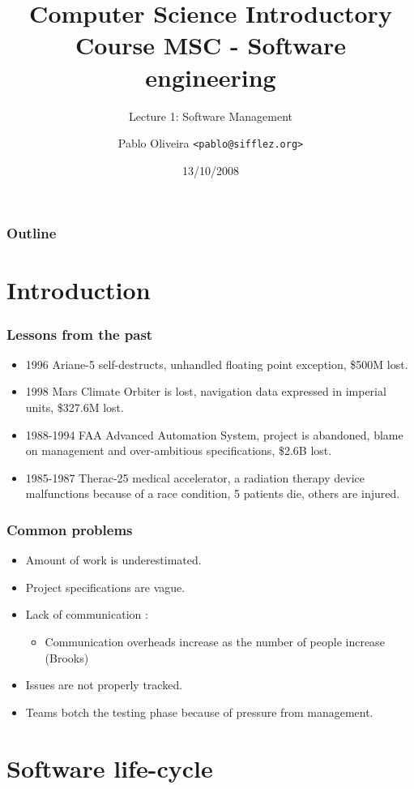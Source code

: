 \documentclass[10pt]{beamer}
\title{Computer Science Introductory Course MSC - Software engineering}
\subtitle{Lecture 1: Software Management}
\author[Pablo Oliveira]{Pablo Oliveira \texttt{<pablo@sifflez.org>}}
\institute{ENST}
\date{13/10/2008}
\begin{document}
\begin{frame}
  \titlepage
\end{frame}

\begin{frame}
  \frametitle{Outline}
  \tableofcontents
\end{frame}

\section{Introduction}
\begin{frame}[fragile]
  \frametitle{Lessons from the past}
  \begin{itemize}
  \item 1996 Ariane-5 self-destructs, unhandled floating point exception,
    \$500M lost.
  \item 1998 Mars Climate Orbiter is lost, navigation data expressed in imperial
    units, \$327.6M lost.
  \item 1988-1994 FAA Advanced Automation System, project is abandoned, blame
    on management and over-ambitious specifications, \$2.6B lost.
  \item 1985-1987 Therac-25 medical accelerator, a radiation therapy device
    malfunctions because of a race condition, 5 patients die, others are injured.
  \end{itemize}
\end{frame}

\begin{frame}[fragile]
  \frametitle{Common problems}
  \begin{itemize}
  \item Amount of work is underestimated.
  \item Project specifications are vague.
  \item Lack of communication :
    \begin{itemize}
    \item Communication overheads increase as the number of people increase
      (Brooks)
    \end{itemize}
  \item Issues are not properly tracked.
  \item Teams botch the testing phase because of pressure from management.
  \end{itemize}
\end{frame}

\section{Software life-cycle}
\end{document}
